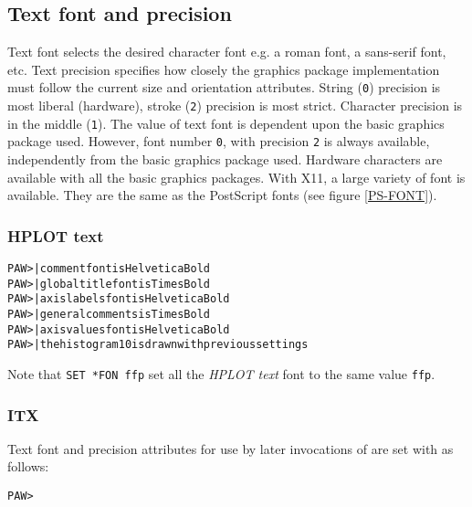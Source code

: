 \subsection*{Text font and precision}
Text font selects the desired character font e.g. a roman font, a sans-serif 
font, etc. Text precision specifies how closely the graphics package 
implementation must follow the current size and orientation attributes. 
String (\texttt{0}) precision is most liberal (hardware), stroke (\texttt{2}) 
precision is most strict. Character precision is in the middle (\texttt{1}). 
The value of text font is dependent upon the basic graphics package used. 
However, font number \texttt{0}, with precision \texttt{2} is always available,
independently from the basic graphics package used.%
Hardware characters are available with all the basic graphics packages. With
X11, a large variety of font is available. They are the same as the PostScript
fonts (see figure \ref{PS-FONT}).

\subsubsection{HPLOT text}
\begin{alltt}
PAW >   | comment font is Helvetica Bold
PAW >   | global title font is Times Bold
PAW >   | axis labels font is Helvetica Bold
PAW >   | general comments is Times Bold
PAW >   | axis values font is Helvetica Bold
PAW >  | the histogram 10 is drawn with previous settings
\end{alltt}
Note that \texttt{SET *FON ffp} set all the {\em HPLOT text} font to the
same value \texttt{ffp}.

\subsubsection{ITX}
Text font and precision attributes for use by later
invocations of  are set with  as follows:
\begin{alltt}
PAW > 
\end{alltt}

